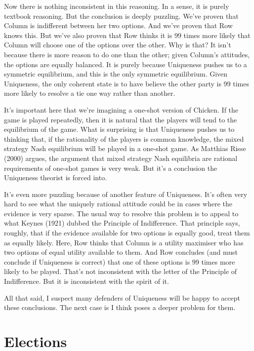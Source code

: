 \documentclass[
  11pt,
]{article}
\begin{document}
Now there is nothing inconsistent in this reasoning. In a sense, it is purely textbook reasoning. But the conclusion is deeply puzzling. We've proven that Column is indifferent between her two options. And we've proven that Row knows this. But we've also proven that Row thinks it is 99 times more likely that Column will choose one of the options over the other. Why is that? It isn't because there is more reason to do one than the other; given Column's attitudes, the options are equally balanced. It is purely because Uniqueness pushes us to a symmetric equilibrium, and this is the only symmetric equilibrium. Given Uniqueness, the only coherent state is to have believe the other party is 99 times more likely to resolve a tie one way rather than another.

It's important here that we're imagining a one-shot version of Chicken. If the game is played repeatedly, then it is natural that the players will tend to the equilibrium of the game. What is surprising is that Uniqueness pushes us to thinking that, if the rationality of the players is common knowledge, the mixed strategy Nash equilibrium will be played in a one-shot game. As Matthias Risse (2000) argues, the argument that mixed strategy Nash equilibria are rational requirements of one-shot games is very weak. But it's a conclusion the Uniqueness theorist is forced into.

It's even more puzzling because of another feature of Uniqueness. It's often very hard to see what the uniquely rational attitude could be in cases where the evidence is very sparse. The usual way to resolve this problem is to appeal to what Keynes (1921) dubbed the Principle of Indifference. That principle says, roughly, that if the evidence available for two options is equally good, treat them as equally likely. Here, Row thinks that Column is a utility maximiser who has two options of equal utility available to them. And Row concludes (and must conclude if Uniqueness is correct) that one of these options is 99 times more likely to be played. That's not inconsistent with the letter of the Principle of Indifference. But it is inconsistent with the spirit of it.

All that said, I suspect many defenders of Uniqueness will be happy to accept these conclusions. The next case is I think poses a deeper problem for them.

\hypertarget{elections}{%
\section{Elections}\label{elections}}
\end{document}
